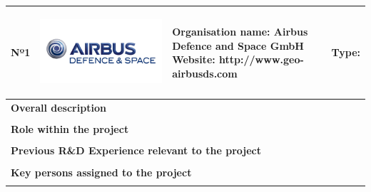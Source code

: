 \begin{longtable}[H]{|p{0.7cm}|p{4cm}|p{7cm}|p{1.3cm}|}
	\hline
	\begin{center} Nº1 \end{center} & \begin{center} \includegraphics[scale=0.09]{./logos/Airbus-defence-and-space-logo} \end{center} & \begin{center} \textbf{Organisation name:} Airbus Defence and Space GmbH \newline \textbf{Website:} http://www.geo-airbusds.com \end{center} & \begin{center} Type: \end{center} \\ \hline
	
	\multicolumn{4}{|p{13cm}|}{\textbf{Overall description}}  \\ \hline
	
	\multicolumn{4}{|p{13cm}|}{}  \\ \hline
	
	\multicolumn{4}{|p{13cm}|}{\textbf{Role within the project}}   \\ \hline
	
	\multicolumn{4}{|p{13cm}|}{}  \\ \hline
	
	\multicolumn{4}{|p{13cm}|}{\textbf{Previous R\&D Experience relevant to the project}}  \\ \hline
	
	\multicolumn{4}{|p{13cm}|}{}  \\ \hline
	
	\multicolumn{4}{|p{13cm}|}{\textbf{Key persons assigned to the project}}   \\ \hline
	
	\multicolumn{4}{|p{13cm}|}{}  \\ \hline
	

\end{longtable}

